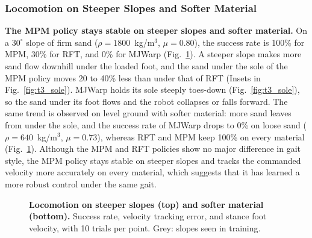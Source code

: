\subsubsection{Locomotion on Steeper Slopes and Softer Material}

\textbf{The MPM policy stays stable on steeper slopes and softer material.}
On a $30^\circ$ slope of firm sand ($\rho=1800$~kg/m$^3$, $\mu=0.80$), the success rate is 100\% for MPM, 30\% for RFT, and 0\% for MJWarp (Fig.~\ref{fig:t3_walk}).
A steeper slope makes more sand flow downhill under the loaded foot, and the sand under the sole of the MPM policy moves 20 to 40\% less than under that of RFT (Insets in Fig.~\ref{fig:t3_sole}).
MJWarp holds its sole steeply toes-down (Fig.~\ref{fig:t3_sole}), so the sand under its foot flows and the robot collapses or falls forward.
The same trend is observed on level ground with softer material: more sand leaves from under the sole, and the success rate of MJWarp drops to 0\% on loose sand ($\rho=640$~kg/m$^3$, $\mu=0.73$), whereas RFT and MPM keep 100\% on every material (Fig.~\ref{fig:t3_walk}).
Although the MPM and RFT policies show no major difference in gait style, the MPM policy stays stable on steeper slopes and tracks the commanded velocity more accurately on every material, which suggests that it has learned a more robust control under the same gait.

\begin{figure}[t]
    \centering
    \caption{
        \textbf{Locomotion on steeper slopes (top) and softer material (bottom).}
        Success rate, velocity tracking error, and stance foot velocity, with 10 trials per point.
        Grey: slopes seen in training.
    }
    \label{fig:t3_walk}
\end{figure}

